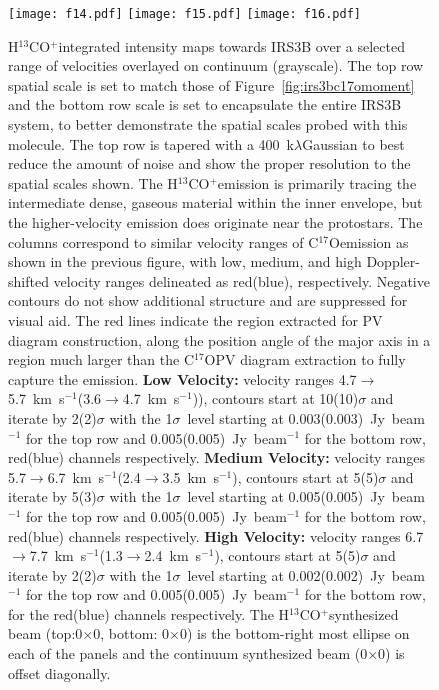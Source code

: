 \documentclass[twocolumn, 12pt]{aastex63}
\newcommand{\cso}{C$^{17}$O}
\newcommand{\htcop}{H$^{13}$CO$^+$}
\newcommand{\kms}{km~s$^{-1}$}
\newcommand{\htcopbeam}{0\farcs85$\times$0\farcs52}
\newcommand{\contbeam}{0\farcs11$\times$0\farcs05}
\begin{document}
\begin{figure}[H]
\begin{center}
   \texttt{[image: f14.pdf]}
   \texttt{[image: f15.pdf]}
   \texttt{[image: f16.pdf]}
\end{center}
   \caption{\htcop\space integrated intensity maps towards IRS3B over a selected range of velocities overlayed on continuum (grayscale). The top row spatial scale is set to match those of Figure~\ref{fig:irs3bc17omoment} and the bottom row scale is set to encapsulate the entire IRS3B system, to better demonstrate the spatial scales probed with this molecule. The top row is tapered with a 400~k$\lambda$\space Gaussian to best reduce the amount of noise and show the proper resolution to the spatial scales shown. The \htcop\space emission is primarily tracing the intermediate dense, gaseous material within the inner envelope, but the higher-velocity emission does originate near the protostars. The columns correspond to similar velocity ranges of \cso\space emission as shown in the previous figure, with low, medium, and high Doppler-shifted velocity ranges delineated as red(blue), respectively. Negative contours do not show additional structure and are suppressed for visual aid. The red lines indicate the region extracted for PV diagram construction, along the position angle of the major axis in a region much larger than the \cso\space PV diagram extraction to fully capture the emission. \textbf{Low Velocity:} velocity ranges 4.7$\rightarrow$5.7~\kms (3.6$\rightarrow$4.7~\kms)), contours start at 10(10)$\sigma$ and iterate by 2(2)$\sigma$ with the 1$\sigma$~level starting at 0.003(0.003)~Jy~beam$^{-1}$ for the top row and 0.005(0.005)~Jy~beam$^{-1}$ for the bottom row,  red(blue) channels respectively.  \textbf{Medium Velocity:} velocity ranges 5.7$\rightarrow$6.7~\kms (2.4$\rightarrow$3.5~\kms), contours start at 5(5)$\sigma$ and iterate by 5(3)$\sigma$ with the 1$\sigma$~level starting at 0.005(0.005)~Jy~beam$^{-1}$ for the top row and 0.005(0.005)~Jy~beam$^{-1}$ for the bottom row, red(blue) channels respectively. \textbf{High Velocity:} velocity ranges 6.7$\rightarrow$7.7~\kms (1.3$\rightarrow$2.4~\kms), contours start at 5(5)$\sigma$ and iterate by 2(2)$\sigma$ with the 1$\sigma$~level starting at 0.002(0.002)~Jy~beam$^{-1}$ for the top row and 0.005(0.005)~Jy~beam$^{-1}$ for the bottom row, for the red(blue) channels respectively. The \htcop\space synthesized beam (top:0$\times$0, bottom: \htcopbeam) is the bottom-right most ellipse on each of the panels and the continuum synthesized beam (\contbeam) is offset diagonally.}\label{fig:h13copmomentc17o}
\end{figure}
\end{document}
